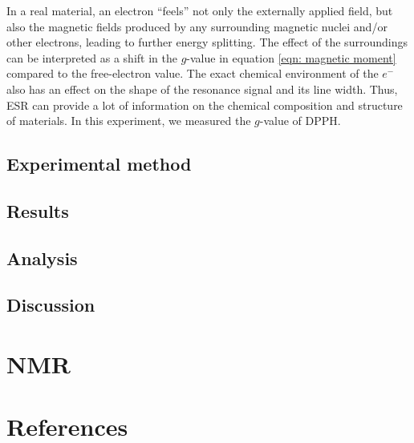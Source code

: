 \documentclass[a4paper]{jpconf}
\numberwithin{equation}{section}
\begin{document}
In a real material, an electron ``feels'' not only the externally applied field, but also the magnetic fields produced by any surrounding magnetic nuclei and/or other electrons, leading to further energy splitting. The effect of the surroundings can be interpreted as a shift in the $g$-value in equation \eqref{eqn: magnetic moment} compared to the free-electron value. The exact chemical environment of the $e^-$ also has an effect on the shape of the resonance signal and its line width. Thus, ESR can provide a lot of information on the chemical composition and structure of materials. In this experiment, we measured the $g$-value of DPPH.

\subsection{Experimental method}

\subsection{Results}

\subsection{Analysis}

\subsection{Discussion}

\section{NMR} 

\section*{References}
\begin{thebibliography}{9}
\end{thebibliography}
\end{document}
